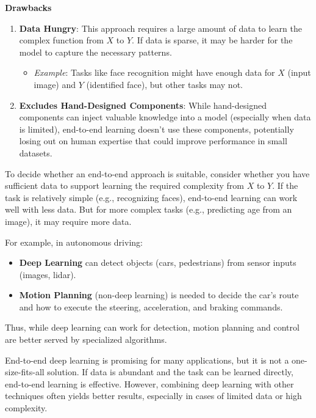 \documentclass[letterpaper,12pt,notitlepage,twoside]{report}
\begin{document}
\textbf{Drawbacks}
\begin{enumerate}
    \item \textbf{Data Hungry}: This approach requires a large amount of data to learn the complex function from \(X\) to \(Y\). If data is sparse, it may be harder for the model to capture the necessary patterns.
    \begin{itemize}
        \item \textit{Example}: Tasks like face recognition might have enough data for \(X\) (input image) and \(Y\) (identified face), but other tasks may not.
    \end{itemize}
    \item \textbf{Excludes Hand-Designed Components}: While hand-designed components can inject valuable knowledge into a model (especially when data is limited), end-to-end learning doesn't use these components, potentially losing out on human expertise that could improve performance in small datasets.
\end{enumerate}

To decide whether an end-to-end approach is suitable, consider whether you have sufficient data to support learning the required complexity from \(X\) to \(Y\). If the task is relatively simple (e.g., recognizing faces), end-to-end learning can work well with less data. But for more complex tasks (e.g., predicting age from an image), it may require more data.

For example, in autonomous driving:
\begin{itemize}
    \item \textbf{Deep Learning} can detect objects (cars, pedestrians) from sensor inputs (images, lidar).
    \item \textbf{Motion Planning} (non-deep learning) is needed to decide the car’s route and how to execute the steering, acceleration, and braking commands.
\end{itemize}
Thus, while deep learning can work for detection, motion planning and control are better served by specialized algorithms.

End-to-end deep learning is promising for many applications, but it is not a one-size-fits-all solution. If data is abundant and the task can be learned directly, end-to-end learning is effective. However, combining deep learning with other techniques often yields better results, especially in cases of limited data or high complexity.

\end{document}
